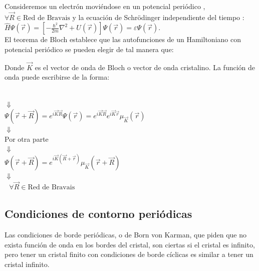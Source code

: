 \documentclass[oneside]{book}
\numberwithin{equation}{section}
\numberwithin{figure}{section}
\numberwithin{table}{section}
\begin{document}
				Consideremos un electrón moviéndose en un potencial periódico , $\forall \vec{R} \in{\text{Red de Bravais}}$ y la ecuación de Schrödinger independiente del tiempo :$\displaystyle \hat{H}\Psi(\vec{r})=\left[-\frac{\hbar^2}{2m}\nabla^2+U(\vec{r})\right]\Psi(\vec{r})=\varepsilon \Psi(\vec{r})$.\\
				
				El teorema de Bloch establece que las autofunciones de un Hamiltoniano con potencial periódico se pueden elegir de tal manera que:
				
				\begin{center}
				\end{center}
				
				Donde $\vec{K}$ es el vector de onda de Bloch o vector de onda cristalino. La función de onda puede escribirse de la forma:
				
				\begin{center}
					\\
					$\Downarrow$\\
					$\displaystyle \Psi(\vec{r}+\vec{R})=e^{i\vec{K}\vec{R}}\Psi(\vec{r})=e^{i\vec{K}\vec{R}}e^{i\vec{K}\vec{r}}\mu_{\vec{K}}(\vec{r})$\\
					$\Downarrow$\\
					Por otra parte\\
					$\Downarrow$\\
					$\displaystyle \Psi(\vec{r}+\vec{R})=e^{i\vec{K}(\vec{R}+\vec{r})}\mu_{\vec{K}}(\vec{r}+\vec{R})$\\
					$\Downarrow$\\
					 $\text{  } \forall \vec{R} \in{\text{Red de Bravais}}$ 
				\end{center}
			
			\subsection{Condiciones de contorno periódicas}
			
				Las condiciones de borde periódicas, o de Born von Karman, que piden que no exista función de onda en los bordes del cristal, son ciertas si el cristal es infinito, pero tener un cristal finito con condiciones de borde cíclicas es similar a tener un cristal infinito.\\
				
\end{document}

